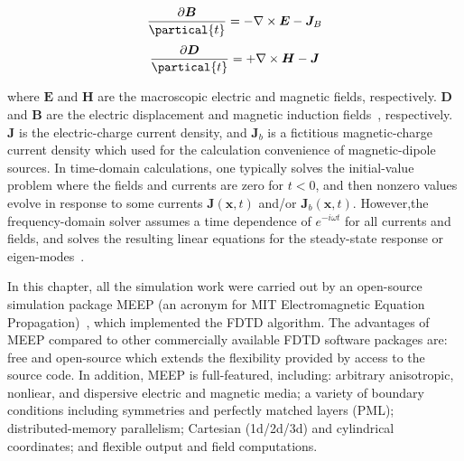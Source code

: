 \begin{equation}
  \frac{\partial\bm{B}}{\partical{t}} = - \nabla \times \bm{E} - \bm{J}_B
\end{equation}
\begin{equation}
  \frac{\partial\bm{D}}{\partical{t}} = + \nabla \times \bm{H} - \bm{J}
\end{equation}

where $\bm{E}$ and $\bm{H}$ are the macroscopic electric and magnetic fields,
respectively. $\bm{D}$ and $\bm{B}$ are the electric displacement and magnetic
induction fields~\cite{jackson1999classical}, respectively. $\bm{J}$ is the
electric-charge current density, and $\bm{J}_b$ is a fictitious magnetic-charge
current density which used for the calculation convenience of magnetic-dipole
sources. In time-domain calculations, one typically solves the initial-value
problem where the fields and currents are zero for $t < 0$, and then nonzero
values evolve in response to some currents $\bm{J}(\bm{x},t)$ and/or
$\bm{J}_b(\bm{x},t)$. However,the frequency-domain solver assumes a time
dependence of $e^{-i\omega{t}}$ for all currents and fields, and solves the
resulting linear equations for the steady-state response or
eigen-modes~\cite{joannopoulos2011photonic}.

In this chapter, all the simulation work were carried out by an open-source
simulation package MEEP (an acronym for MIT Electromagnetic Equation
Propagation)~\cite{Oskooi:2010fb}, which implemented the FDTD algorithm. The
advantages of MEEP compared to other commercially available FDTD software
packages are: free and open-source which extends the flexibility provided by
access to the source code. In addition, MEEP is full-featured, including:
arbitrary anisotropic, nonliear, and dispersive electric and magnetic media; a
variety of boundary conditions including symmetries and perfectly matched
layers (PML); distributed-memory parallelism; Cartesian (1d/2d/3d) and
cylindrical coordinates; and flexible output and field computations.


